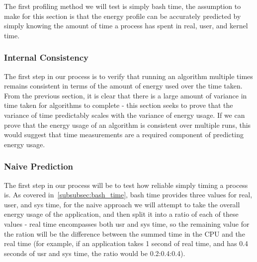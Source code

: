 The first profiling method we will test is simply bash time, the assumption to make for this section is that the energy
profile can be accurately predicted by simply knowing the amount of time a process has spent in real, user, and kernel
time.

\subsubsection{Internal Consistency}
The first step in our process is to verify that running an algorithm multiple times remains consistent in terms of the
amount of energy used over the time taken.
From the previous section, it is clear that there is a large amount of variance in time taken for algorithms to complete
- this section seeks to prove that the variance of time predictably scales with the variance of energy usage.
If we can prove that the energy usage of an algorithm is consistent over multiple runs, this would suggest that time
measurements are a required component of predicting energy usage.

\subsubsection{Naive Prediction}
The first step in our process will be to test how reliable simply timing a process is.
As covered in~\ref{subsubsec:bash_time}, bash time provides three values for real, user, and sys time, for the naive
approach we will attempt to take the overall energy usage of the application, and then split it into a ratio of each of
these values - real time encompasses both usr and sys time, so the remaining value for the ration will be the difference
between the summed time in the CPU and the real time (for example, if an application takes 1 second of real time, and
has 0.4 seconds of usr and sys time, the ratio would be 0.2:0.4:0.4).

